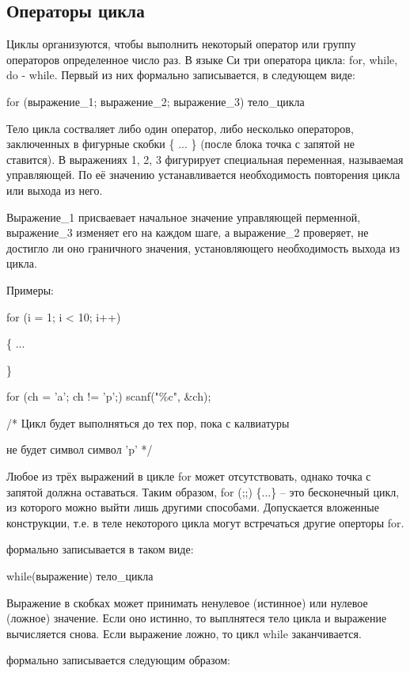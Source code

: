 \documentclass[a4paper, fontsize=10bp]{article} %
\begin{document}
\subsection*{Операторы цикла}

\noindent Циклы организуются, чтобы выполнить некоторый оператор или группу операторов определенное число
раз. В языке Си три оператора цикла: for, while, do - while. Первый из них формально записывается, в 
следующем виде: 

for (выражение\_1; выражение\_2; выражение\_3) тело\_цикла

\noindent  Тело цикла состваляет либо один оператор, либо несколько операторов, заключенных в фигурные скобки \{ ... 
\}  (после блока точка с запятой не ставится). В выражениях 1, 2, 3 фигурирует специальная переменная,
называемая управляющей. По её значению устанавливается необходимость повторения цикла или выхода из
него.

\noindent Выражение\_1 присваевает начальное значение управляющей перменной, выражение\_3 изменяет его на
каждом шаге, а выражение\_2 проверяет, не достигло ли оно граничного значения, установляющего
необходимость выхода из цикла.

\noindent  Примеры:

for (i = 1; i < 10; i++)

\{
...

\} \bigskip

for (ch = 'a'; ch != 'p';) scanf("\%c"{}, \&ch);

/* Цикл будет выполняться до тех пор, пока с калвиатуры

не будет символ символ 'p' */

\noindent  Любое из трёх выражений в цикле for может отсутствовать, однако точка с запятой должна оставаться.
Таким образом, for (;;) \{...\} -- это бесконечный цикл, из которого можно выйти лишь другими способами.
Допускается вложенные конструкции, т.е. в теле некоторого цикла могут встречаться другие оперторы for.

 формально записывается в таком виде: 

while(выражение) тело\_цикла

\noindent Выражение в скобках может принимать ненулевое (истинное) или нулевое (ложное) значение. Если оно 
истинно, то выплнятеся тело цикла и выражение вычисляется снова. Если выражение ложно, то цикл while
заканчивается.

 формально записывается следующим образом:
\end{document}

